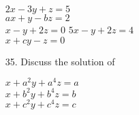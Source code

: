 \documentclass[12pt,a4paper]{article}
\begin{document}
\begin{enumerate}
             $2x-3y+z=5$\\
             $ax+y-bz=2$\\ 
             $x-y+2z=0 $
             $5x-y+2z=4$\\
             $x+cy-z=0$
            
        \item [35.] Discuss the solution of
            
            $x+a^2y+a^4z=a$\\ 
            $x+b^2y+b^4z=b$\\ 
            $x+c^2y+c^4z=c $
                
    \end{enumerate}
\end{document}
